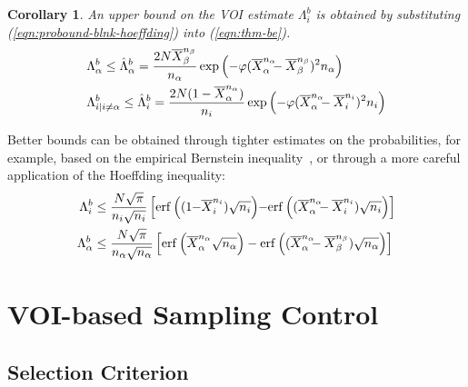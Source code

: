 \documentclass[]{article}
\newtheorem{crl}{Corollary}
\begin{document}
\begin{crl}
An upper bound on the VOI estimate $\Lambda_i^b$ is obtained
by substituting (\ref{eqn:probound-blnk-hoeffding}) into (\ref{eqn:thm-be}).
\begin{align}
  \label{eqn:bound-blnk-hoeffding}
  \Lambda&_\alpha^b \le \hat\Lambda_\alpha^b=\frac {2N\overline X_\beta^{n_\beta}} {n_\alpha}\exp\left(- \varphi(\overline X_\alpha^{n_\alpha}\hspace{-0.5em} - \overline X_\beta^{n_\beta})^2 n_\alpha\right)\nonumber\\
  \Lambda&_{i|i\ne\alpha}^b\le \hat\Lambda_i^b=  \frac {2N(1-\overline  X_\alpha^{n_\alpha})} {n_i}\exp\left(- \varphi(\overline X_\alpha^{n_\alpha}\hspace{-0.5em} - \overline X_i^{n_i})^2 n_i\right)
\end{align}
\label{crl:bound-blnk-hoeffding}
\end{crl}
\vspace{-2em}
Better bounds can be obtained through tighter estimates on the
probabilities, for example, based on the empirical Bernstein
inequality~\cite{MaurerPontil.benrstein}, or through a more careful
application of the Hoeffding inequality:
\begin{align}
\Lambda_i^b&\le\frac {N\sqrt \pi} {n_i \sqrt {n_i}}
  \left[\mathrm{erf}\left((1\hspace{-0.25em}-\hspace{-0.25em}\overline X_i^{n_i})\sqrt {n_i}\right)
      \hspace{-0.25em}-\hspace{-0.25em}\mathrm{erf}\left((\overline X_\alpha^{n_\alpha}\hspace{-0.5em} - \overline X_i^{n_i})\sqrt{n_i}\right)\right]\nonumber\\
\Lambda_\alpha^b&\le\frac {N\sqrt \pi} {n_\alpha \sqrt {n_\alpha}}
  \left[\mathrm{erf}\left(\overline X_\alpha^{n_\alpha}\sqrt {n_\alpha}\right)
      -\mathrm{erf}\left((\overline X_\alpha^{n_\alpha}\hspace{-0.5em} - \overline X_\beta^{n_\beta})\sqrt{n_\alpha}\right)\right]
\label{eqn:erf-blinkered}
\end{align}

\section{VOI-based Sampling Control}

\subsection{Selection Criterion}
\end{document}
